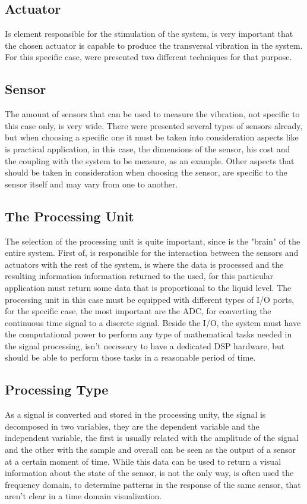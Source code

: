 \subsection*{Actuator}
Is element  responsible for the stimulation of the system, is very important that the chosen actuator is capable to produce the transversal vibration in the system. For this specific case, were presented two different techniques for that purpose.
\subsection*{Sensor}
The amount of sensors that can be used to measure the vibration, not specific to this case only, is very wide. There were presented several types of sensors already, but when choosing a specific one it must be taken into consideration aspects like is practical application, in this case, the dimensions of the sensor, his cost and the coupling with the system to be measure, as an example. Other aspects that should be taken in consideration when choosing the sensor, are specific to the sensor itself and may vary from one to another.
\subsection*{The Processing Unit}
The selection of the processing unit is quite important, since is the "brain" of the entire system. First of, is responsible for the interaction between the sensors and actuators with the rest of the system, is where the data is processed and the resulting information information returned to the used, for this particular application must return some data that is proportional to the liquid level. The processing unit in this case must be equipped with different types of I/O ports, for the specific case, the most important are the ADC, for converting the continuous time signal to a discrete signal. Beside the I/O, the system must have the computational power to perform any type of mathematical tasks needed in the signal processing, isn't necessary to have a dedicated DSP hardware, but should be able to perform those tasks in a reasonable period of time.  
\subsection*{Processing Type}
As a signal is converted and stored in the processing unity, the signal is decomposed in two variables, they are the dependent variable and the independent variable, the first is usually related with the amplitude of the signal and the other with the sample and overall can be seen as the output of a sensor at a certain moment of time. While this data can be used to return a visual information about the state of the sensor, is not the only way, is often used the frequency domain, to determine patterns in the response of the same sensor, that aren't clear in a time domain visualization.

